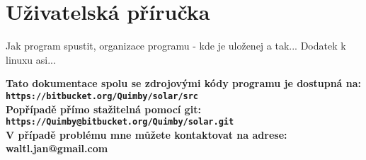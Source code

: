 \chapter{Uživatelská příručka}
\label{chap:userGuide}
Jak program spustit, organizace programu - kde je uloženej a tak...
Dodatek k linuxu asi...

\begin{center}
	\textbf{	
		Tato dokumentace spolu se zdrojovými kódy programu je dostupná na:\\
		\texttt{https://bitbucket.org/Quimby/solar/src}\\
		Popřípadě přímo stažitelná pomocí git:	\\
		\texttt{https://Quimby@bitbucket.org/Quimby/solar.git}\\
		V případě problému mne můžete kontaktovat na adrese: waltl.jan@gmail.com
	}
\end{center}